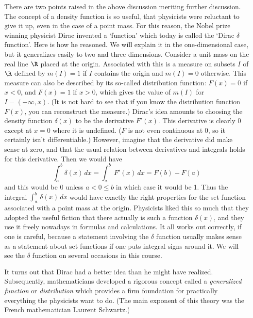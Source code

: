 There are two points raised in the above discussion meriting
further discussion.  The concept of a density function is
so useful, that physicists were reluctant to give it up, even
in the case of a point mass.  For this reason, the Nobel
prize winning physicist Dirac invented a `function' which
today is called the `Dirac $\delta$ function'.  Here is
%
how he reasoned.   We will explain it in the one-dimensional
case, but it generalizes easily to two and three dimensions.
  Consider a unit mass on the real line
$\R$ placed at the origin.
Associated with this is a measure on subsets $I$ of $\R$  defined by
$m(I) = 1$ if $I$ contains the origin and $m(I) = 0$ otherwise.
This measure can also be described by its so-called distribution
function:  $F(x) = 0$ if $x < 0$, and $F(x) = 1$ if $x > 0$,
which gives the value of $m(I)$ for
$I = (-\infty,x)$.  (It is not hard to see that  if you know the
distribution function  $F(x)$, you can reconstruct
the measure.)  Dirac's idea amounts  to choosing the density function
$\delta(x)$ to be the derivative $F'(x)$.  This derivative is
clearly $0$ except at $x = 0$ where it is undefined.  ($F$ is
not even continuous at 0, so it certainly isn't
differentiable.)  However, imagine that the derivative did make sense
at zero, and that the usual relation between derivatives and
integrals holds for this derivative.  Then we would have
$$
  \int_a^b \delta(x)\,dx = \int_a^b \,F'(x)\,dx = F(b) - F(a)
$$
and this would be $0$ unless $a < 0 \le b$ in which case
it would be 1.  Thus the integral
$\int_a^b\,\delta(x)\,dx$ would have exactly the right properties
for the set function associated with a point mass at the
origin.   Physicists liked this so much that they adopted the
useful fiction that there actually is such a function
$\delta(x)$, and they
 use it freely nowadays in formulas and calculations.  It
all works out correctly, if one is careful, because a
statement involving the $\delta$ function
 usually  makes sense as a statement about set functions
 if one puts integral signs around it.
 We will see the $\delta$
function on several occasions in this course.

  It turns out that Dirac had a better idea than he might have
realized.  Subsequently, mathematicians developed a rigorous
concept called a {\it generalized function\/} or 
{\it distribution\/} which 
%
provides a firm foundation for practically everything the
physicists want to do.  (The main exponent of this theory
was the French mathematician Laurent Schwartz.) 
%
  
